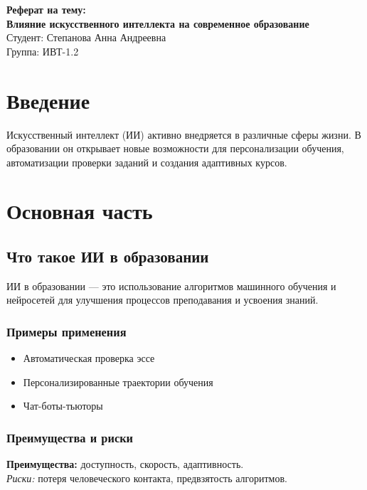 \documentclass[14pt]{extreport}
\begin{document}
\begin{titlepage}
\centering
\vspace*{2cm}
{\Huge \textbf{Реферат на тему:}} \\[1cm]
{\huge \textbf{Влияние искусственного интеллекта на современное образование}} \\[3cm]
{\Large Студент: Степанова Анна Андреевна} \\
{\Large Группа: ИВТ-1.2} \\[1cm]

\end{titlepage}

\cfoot{}

\tableofcontents
\newpage

\cfoot{\thepage}

\chapter{Введение}
Искусственный интеллект (ИИ) активно внедряется в различные сферы жизни. В образовании он открывает новые возможности для персонализации обучения, автоматизации проверки заданий и создания адаптивных курсов.

\chapter{Основная часть}
\section{Что такое ИИ в образовании}
ИИ в образовании — это использование алгоритмов машинного обучения и нейросетей для улучшения процессов преподавания и усвоения знаний.

\subsection{Примеры применения}
\begin{itemize}
\item Автоматическая проверка эссе
\item Персонализированные траектории обучения
\item Чат-боты-тьюторы
\end{itemize}

\subsection{Преимущества и риски}
\textbf{Преимущества:} доступность, скорость, адаптивность. \\
\textit{Риски:} потеря человеческого контакта, предвзятость алгоритмов.
\end{document}
